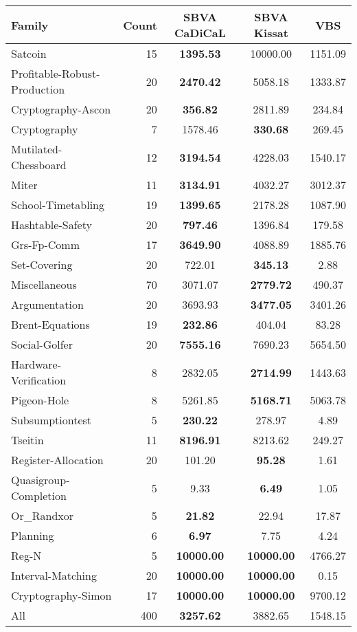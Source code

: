 \begin{tabular}{lr|cc|c}
\toprule
Family & Count & SBVA CaDiCaL & SBVA Kissat & VBS \\
\midrule
Satcoin & 15 & \bfseries 1395.53 & 10000.00 & 1151.09 \\
Profitable-Robust-Production & 20 & \bfseries 2470.42 & 5058.18 & 1333.87 \\
Cryptography-Ascon & 20 & \bfseries 356.82 & 2811.89 & 234.84 \\
Cryptography & 7 & 1578.46 & \bfseries 330.68 & 269.45 \\
Mutilated-Chessboard & 12 & \bfseries 3194.54 & 4228.03 & 1540.17 \\
Miter & 11 & \bfseries 3134.91 & 4032.27 & 3012.37 \\
School-Timetabling & 19 & \bfseries 1399.65 & 2178.28 & 1087.90 \\
Hashtable-Safety & 20 & \bfseries 797.46 & 1396.84 & 179.58 \\
Grs-Fp-Comm & 17 & \bfseries 3649.90 & 4088.89 & 1885.76 \\
Set-Covering & 20 & 722.01 & \bfseries 345.13 & 2.88 \\
Miscellaneous & 70 & 3071.07 & \bfseries 2779.72 & 490.37 \\
Argumentation & 20 & 3693.93 & \bfseries 3477.05 & 3401.26 \\
Brent-Equations & 19 & \bfseries 232.86 & 404.04 & 83.28 \\
Social-Golfer & 20 & \bfseries 7555.16 & 7690.23 & 5654.50 \\
Hardware-Verification & 8 & 2832.05 & \bfseries 2714.99 & 1443.63 \\
Pigeon-Hole & 8 & 5261.85 & \bfseries 5168.71 & 5063.78 \\
Subsumptiontest & 5 & \bfseries 230.22 & 278.97 & 4.89 \\
Tseitin & 11 & \bfseries 8196.91 & 8213.62 & 249.27 \\
Register-Allocation & 20 & 101.20 & \bfseries 95.28 & 1.61 \\
Quasigroup-Completion & 5 & 9.33 & \bfseries 6.49 & 1.05 \\
Or\_Randxor & 5 & \bfseries 21.82 & 22.94 & 17.87 \\
Planning & 6 & \bfseries 6.97 & 7.75 & 4.24 \\
Reg-N & 5 & \bfseries 10000.00 & \bfseries 10000.00 & 4766.27 \\
Interval-Matching & 20 & \bfseries 10000.00 & \bfseries 10000.00 & 0.15 \\
Cryptography-Simon & 17 & \bfseries 10000.00 & \bfseries 10000.00 & 9700.12 \\
\hline All & 400 & \bfseries 3257.62 & 3882.65 & 1548.15 \\
\bottomrule
\end{tabular}

